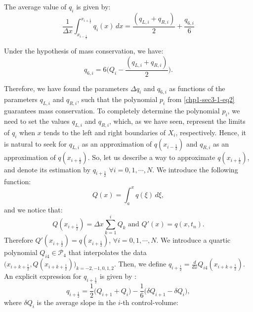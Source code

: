 The average value of $q_i$ is given by:
\begin{equation}
	\label{chp1-sec-recon-ppm-eq3}
	\frac{1}{\Delta x}\int_{x_{i-\frac{1}{2}}}^{x_{i+\frac{1}{2}}} {q}_i(x) \,dx
	= \frac{(q_{L,i} + q_{R,i})}{2} + \frac{q_{6,i}}{6}
\end{equation}

Under the hypothesis of mass conservation, we have:
\begin{equation}
	\label{chp1-sec-recon-ppm-eq4}
	q_{6,i} = 6\bigg(Q_i - \frac{(q_{L,i} + q_{R,i})}{2}\bigg).
\end{equation}

Therefore, we have found the parameters $\Delta q_i$ and $q_{6, i}$ as
functions of the parameters $q_{L, i}$ and $q_{R, i}$,
such that the polynomial $p_i$ from \eqref{chp1-sec3-1-eq2} 
guarantees mass conservation. To completely determine the 
polynomial $p_i$, we need to set the values $q_{L, i}$ and
$q_{R, i}$, which, as we have seen, represent the limits of $q_i$ when
$x$ tends to the left and right boundaries of $X_i$, respectively.
Hence, it is natural to seek for $q_{L, i}$ as an approximation of $q(x_{i-\frac{1}{2}})$
and $q_{R, i}$ as an approximation of $q(x_{i+\frac{1}{2}})$.
So, let us describe a way to approximate $q(x_{i+\frac{1}{2}})$, and denote its estimation by
$q_{i+\frac{1}{2}}$ $\forall i = 0, 1, \cdots, N$.
We introduce the following function:
\begin{equation}
	\label{chp1-sec-recon-ppm-eq5}
	Q(x) = \int_{a}^{x} q(\xi) \,d\xi,
\end{equation}
and we notice that:
\begin{equation}
	\label{chp1-sec-recon-ppm-eq6}
	Q(x_{i+\frac{1}{2}}) = \Delta x \sum_{k=1}^{i} Q_k \text{ and } Q'(x) = q(x,t_n).
\end{equation}
Therefore $Q'(x_{i+\frac{1}{2}}) = q(x_{i+\frac{1}{2}}) $, $\forall i = 0, 1, \cdots, N$.
We introduce a quartic polynomial $Q_{i4} \in \mathcal{P}_4$ that interpolates the data
$\big(x_{i+k+\frac{1}{2}}, Q(x_{i+k+\frac{1}{2}})\big)_{k=-2,-1,0,1,2}$. Then, we define
$q_{i+\frac{1}{2}} = \frac{d}{dx}Q_{i4}(x_{i+k+\frac{1}{2}})$.
An explicit expression for $q_{i+\frac{1}{2}}$ is given by \citep{colella:1984}:
\begin{equation}
	\label{chp1-sec-recon-ppm-eq7}
	q_{i+\frac{1}{2}} = \frac{1}{2} \bigg( Q_{i+1} + Q_{i} \bigg) - \frac{1}{6} \bigg( \delta Q_{i+1} - \delta Q_{i}\bigg),
\end{equation}
where $\delta Q_{i}$ is the average slope in the $i$-th control-volume:
